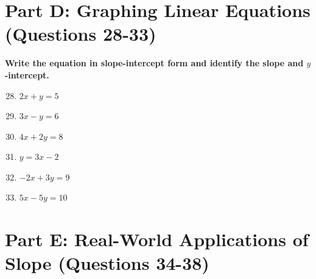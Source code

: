 \documentclass[12pt]{article}
\begin{document}
\section*{Part D: Graphing Linear Equations (Questions 28-33)}

\noindent\textbf{Write the equation in slope-intercept form and identify the slope and $y$-intercept.}

\begin{enumerate}
\setcounter{enumi}{27}

\item $2x + y = 5$

\vspace{1cm}

\item $3x - y = 6$

\vspace{1cm}

\item $4x + 2y = 8$

\vspace{1cm}

\item $y = 3x - 2$

\vspace{1cm}

\item $-2x + 3y = 9$

\vspace{1cm}

\item $5x - 5y = 10$

\vspace{1cm}

\end{enumerate}

\section*{Part E: Real-World Applications of Slope (Questions 34-38)}
\end{document}
